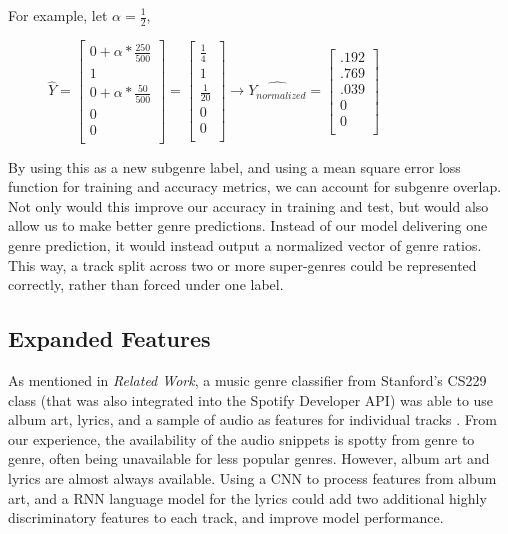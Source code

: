 \documentclass[conference]{IEEEtran}
\begin{document}
For example, let $\alpha=\frac{1}{2}$,

\begin{figure}[ht]
\centering
$\hat{Y}=
\begin{bmatrix}
0+\alpha*\frac{250}{500}\\
1\\
0+\alpha*\frac{50}{500}\\
0\\
0\\
\end{bmatrix}
=
\begin{bmatrix}
\frac{1}{4}\\
1\\
\frac{1}{20}\\
0\\
0\\
\end{bmatrix}
\rightarrow
\hat{Y_{normalized}} = 
\begin{bmatrix}
.192\\
.769\\
.039\\
0\\
0\\
\end{bmatrix}
$
\end{figure}

By using this as a new subgenre label, and using a mean square error loss function for training and accuracy metrics, we can account for subgenre overlap. Not only would this improve our accuracy in training and test, but would also allow us to make better genre predictions. Instead of our model delivering one genre prediction, it would instead output a normalized vector of genre ratios. This way, a track split across two or more super-genres could be represented correctly, rather than forced under one label.

\subsection{Expanded Features}
As mentioned in \emph{Related Work}, a music genre classifier from Stanford's CS229 class (that was also integrated into the Spotify Developer API) was able to use album art, lyrics, and a sample of audio as features for individual tracks \cite{b5}. From our experience, the availability of the audio snippets is spotty from genre to genre, often being unavailable for less popular genres. However, album art and lyrics are almost always available. Using a CNN to process features from album art, and a RNN language model for the lyrics could add two additional highly discriminatory features to each track, and improve model performance.
\end{document}
